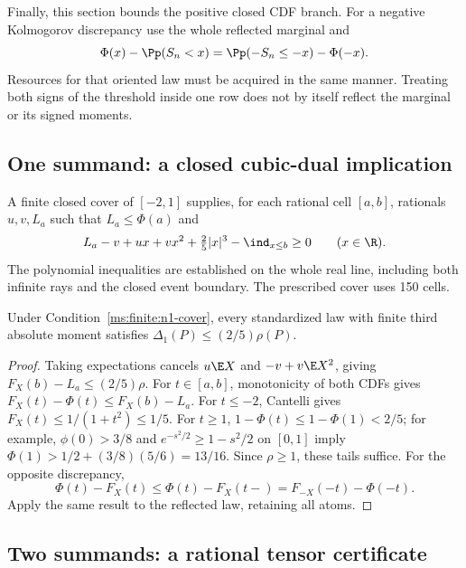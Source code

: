 Finally, this section bounds the positive closed CDF branch. For a negative
Kolmogorov discrepancy use the whole reflected marginal and
\[
 \Phi(x)-\Pp(S_n<x)=\Pp(-S_n\le-x)-\Phi(-x).
\]
Resources for that oriented law must be acquired in the same manner.
Treating both signs of the threshold inside one row does not by itself
reflect the marginal or its signed moments.



\subsection{One summand: a closed cubic-dual implication}
\label{ms:finite:n1}
\begin{condition}\label{ms:finite:n1-cover}
A finite closed cover of $[-2,1]$ supplies, for each rational cell $[a,b]$,
rationals $u,v,L_a$ such that $L_a\le\Phi(a)$ and
\[
 L_a-v+ux+vx^2+\tfrac25|x|^3-\ind_{x\le b}\ge0
 \qquad(x\in\R).
\]
The polynomial inequalities are established on the whole real line,
including both infinite rays and the closed event boundary. The prescribed
cover uses 150 cells.
\end{condition}
\begin{proposition}\label{ms:finite:n1-bound}
Under Condition~\ref{ms:finite:n1-cover}, every standardized law with
finite third absolute moment satisfies $\Delta_1(P)\le(2/5)\rho(P)$.
\end{proposition}
\begin{proof}
Taking expectations cancels $u\E X$ and $-v+v\E X^2$, giving
$F_X(b)-L_a\le(2/5)\rho$. For $t\in[a,b]$, monotonicity of both
CDFs gives $F_X(t)-\Phi(t)\le F_X(b)-L_a$.
For $t\le-2$, Cantelli gives $F_X(t)\le1/(1+t^2)\le1/5$.
For $t\ge1$, $1-\Phi(t)\le1-\Phi(1)<2/5$; for example,
$\phi(0)>3/8$ and $e^{-s^2/2}\ge1-s^2/2$ on $[0,1]$ imply
$\Phi(1)>1/2+(3/8)(5/6)=13/16$. Since $\rho\ge1$, these tails
suffice. For the opposite discrepancy,
\[
 \Phi(t)-F_X(t)\le\Phi(t)-F_X(t-)
   =F_{-X}(-t)-\Phi(-t).
\]
Apply the same result to the reflected law, retaining all atoms.
\end{proof}

\subsection{Two summands: a rational tensor certificate}\label{ms:finite:n2:section}
